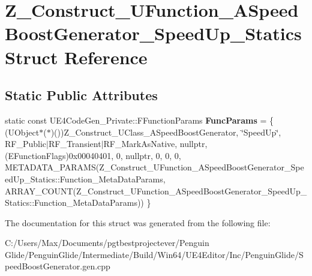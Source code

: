 \hypertarget{struct_z___construct___u_function___a_speed_boost_generator___speed_up___statics}{}\section{Z\+\_\+\+Construct\+\_\+\+U\+Function\+\_\+\+A\+Speed\+Boost\+Generator\+\_\+\+Speed\+Up\+\_\+\+Statics Struct Reference}
\label{struct_z___construct___u_function___a_speed_boost_generator___speed_up___statics}
\subsection*{Static Public Attributes}
\begin{DoxyCompactItemize}
\item 
\mbox{\label{struct_z___construct___u_function___a_speed_boost_generator___speed_up___statics_acbeee0128aa7f4cf11bec962334894a2}} 
static const U\+E4\+Code\+Gen\+\_\+\+Private\+::\+F\+Function\+Params {\bfseries Func\+Params} = \{ (U\+Object$\ast$($\ast$)())Z\+\_\+\+Construct\+\_\+\+U\+Class\+\_\+\+A\+Speed\+Boost\+Generator, \char`\"{}Speed\+Up\char`\"{}, R\+F\+\_\+\+Public$\vert$R\+F\+\_\+\+Transient$\vert$R\+F\+\_\+\+Mark\+As\+Native, nullptr, (E\+Function\+Flags)0x00040401, 0, nullptr, 0, 0, 0, M\+E\+T\+A\+D\+A\+T\+A\+\_\+\+P\+A\+R\+A\+M\+S(\+Z\+\_\+\+Construct\+\_\+\+U\+Function\+\_\+\+A\+Speed\+Boost\+Generator\+\_\+\+Speed\+Up\+\_\+\+Statics\+::\+Function\+\_\+\+Meta\+Data\+Params, A\+R\+R\+A\+Y\+\_\+\+C\+O\+U\+N\+T(\+Z\+\_\+\+Construct\+\_\+\+U\+Function\+\_\+\+A\+Speed\+Boost\+Generator\+\_\+\+Speed\+Up\+\_\+\+Statics\+::\+Function\+\_\+\+Meta\+Data\+Params)) \}
\end{DoxyCompactItemize}


The documentation for this struct was generated from the following file\+:\begin{DoxyCompactItemize}
\item 
C\+:/\+Users/\+Max/\+Documents/pgtbestprojectever/\+Penguin Glide/\+Penguin\+Glide/\+Intermediate/\+Build/\+Win64/\+U\+E4\+Editor/\+Inc/\+Penguin\+Glide/Speed\+Boost\+Generator.\+gen.\+cpp\end{DoxyCompactItemize}
